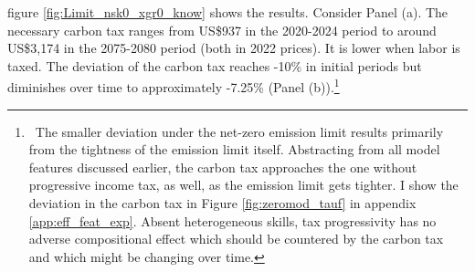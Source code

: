 \begin{figure}[h!!]
\begin{subfigure}[]{0.4\textwidth}
\end{subfigure}				%
 \end{figure} 
 
 
figure \ref{fig:Limit_nsk0_xgr0_know} shows the results.
Consider Panel (a). The necessary carbon tax ranges from US\$937  in the 2020-2024 period to around US\$3,174 in the 2075-2080 period (both in 2022 prices). It is lower when labor is taxed. The deviation of the carbon tax reaches -10\% in initial periods but diminishes over time to approximately -7.25\% (Panel (b)).\footnote{\ The smaller deviation under the net-zero emission limit results primarily from the tightness of the emission limit itself. Abstracting from all model features discussed earlier, the carbon tax approaches the one without progressive income tax, as well, as the emission limit gets tighter. I show the deviation in the carbon tax in Figure \ref{fig:zeromod_tauf} in appendix \ref{app:eff_feat_exp}. Absent heterogeneous skills, tax progressivity has no adverse compositional effect which should be countered by the carbon tax and which might be changing over time. }

